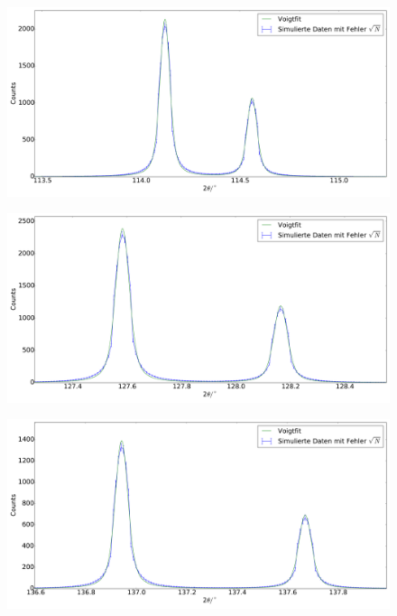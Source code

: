 \begin{figure}[H]
\begin{minipage}{.52\textwidth}
  \centering
  \includegraphics[scale=0.18]{Simulation_Siliciumpulver_9}
  \label{fig:pul_sim_sil_9}
\end{minipage}
\hspace{0.2cm}
\begin{minipage}{.52\textwidth}
  \centering
  \includegraphics[scale=0.18]{Simulation_Siliciumpulver_10}
  \label{fig:pul_sim_sil_10}
\end{minipage}
\end{figure}
\begin{figure}[H]
\begin{minipage}{.52\textwidth}
  \centering
  \includegraphics[scale=0.18]{Simulation_Siliciumpulver_11}
  \label{fig:pul_sim_sil_11}
\end{minipage}
\end{figure}
